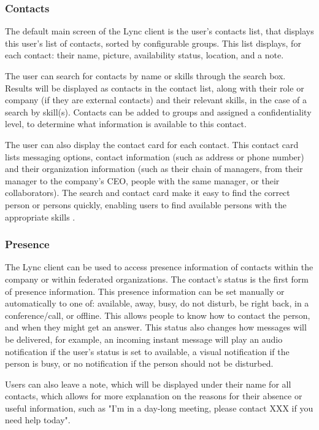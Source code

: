 \subsubsection{Contacts}
The default main screen of the Lync client is the user's contacts list, that displays this user's list of contacts, sorted by configurable groups. This list displays, for each contact: their name, picture, availability status, location, and a note.

The user can search for contacts by name or skills through the search box. Results will be displayed as contacts in the contact list, along with their role or company (if they are external contacts) and their relevant skills, in the case of a search by skill(s). Contacts can be added to groups and assigned a confidentiality level, to determine what information is available to this contact.

The user can also display the contact card for each contact. This contact card lists messaging options, contact information (such as address or phone number) and their organization information (such as their chain of managers, from their manager to the company's CEO, people with the same manager, or their collaborators). The search and contact card make it easy to find the correct person or persons quickly, enabling users to find available persons with the appropriate skills
\cite[Ch. 1.1]{winters_mastering_2012}.


\subsubsection{Presence}
The Lync client can be used to access presence information of contacts within the company or within federated organizations. The contact's status is the first form of presence information. This presence information can be set manually or automatically to one of: available, away, busy, do not disturb, be right back, in a conference/call, or offline. This allows people to know how to contact the person, and when they might get an answer. This status also changes how messages will be delivered, for example, an incoming instant message will play an audio notification if the user's status is set to available, a visual notification if the person is busy, or no notification if the person should not be disturbed.

Users can also leave a note, which will be displayed under their name for all contacts, which allows for more explanation on the reasons for their absence or useful information, such as "I'm in a day-long meeting, please contact XXX if you need help today".

